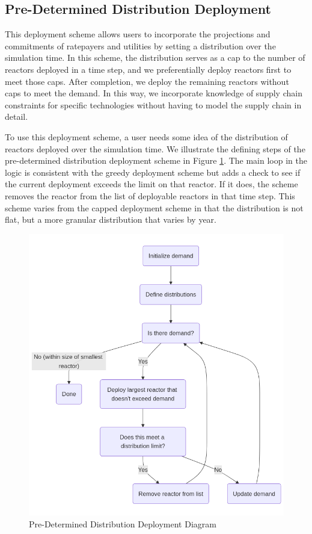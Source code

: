 \subsection{Pre-Determined Distribution Deployment}
\label{sec:pre_determined_distribution_deployment}
This deployment scheme allows users to incorporate the projections and
commitments of ratepayers and utilities by setting a distribution over the
simulation time. In this scheme, the distribution serves as a cap to the
number of reactors deployed in a time step, and we preferentially
deploy reactors first to meet those caps. After completion, we deploy the
remaining reactors without caps to meet the demand. In this way, we incorporate
knowledge of supply chain constraints for specific technologies without having
to model the supply chain in detail.

To use this deployment scheme, a user needs some idea of the distribution of
reactors deployed over the simulation time. We illustrate the defining steps of
the pre-determined distribution deployment scheme in Figure
\ref{fig:pre_det_diagram}. The main loop in the logic is consistent with the
greedy deployment scheme but adds a check to see if the current deployment
exceeds the limit on that reactor. If it does, the scheme removes the reactor
from the list of deployable reactors in that time step. This scheme varies from
the capped deployment scheme in that the distribution is not flat, but a more
granular distribution that varies by year.

\begin{figure}[!hp]
    \centering
    \includegraphics[scale=0.4]{images/schemes/pre_det_diagram.png}
    \caption{Pre-Determined Distribution Deployment Diagram}
    \label{fig:pre_det_diagram}
\end{figure}

